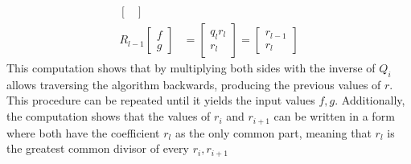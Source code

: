 \documentclass[11pt,a4paper]{article}
\begin{document}
\begin{enumerate}
\begin{enumerate}
\begin{align*}
\begin{bmatrix}
			                                                                \end{bmatrix}    \\
			            R_{l - 1}\begin{bmatrix}
				                     f \\ g
			                     \end{bmatrix}            & = \begin{bmatrix}
				                                                  q_lr_l \\ r_l
			                                                  \end{bmatrix} = \begin{bmatrix}
				                                                                  r_{l - 1} \\ r_l
			                                                                  \end{bmatrix}
		            \end{align*}
		            This computation shows that by multiplying both sides with the inverse of $Q_i$ allows traversing
		            the algorithm backwards, producing the previous values of $r$. This procedure can be repeated until it yields the input values $f, g$.
		            Additionally, the computation shows that the values of $r_i$ and $r_{i + 1}$ can be written in a form where both have the coefficient
		            $r_l$ as the only common part, meaning that $r_l$ is the greatest common divisor of every $r_i, r_{i + 1}$

		            \newpage


\end{enumerate}
\end{enumerate}
\end{document}

